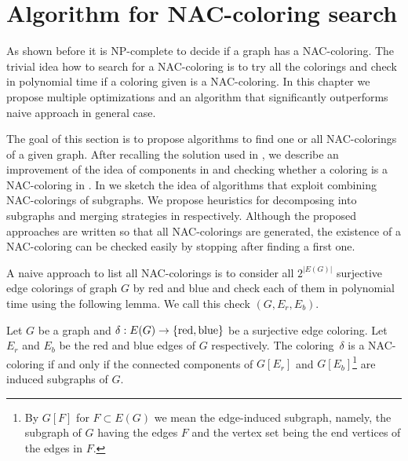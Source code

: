 \chapter{Algorithm for NAC-coloring search}%
\label{chapter:alg}

\begin{chapterabstract}

	As shown before it is NP-complete to decide if a graph has a NAC-coloring.
	The trivial idea how to search for a NAC-coloring is to try all the colorings
	and check in polynomial time if a coloring given is a NAC-coloring.
	In this chapter we propose multiple optimizations
	and an algorithm that significantly outperforms naive approach in general case.

\end{chapterabstract}


The goal of this section is to propose algorithms to find one or all NAC-colorings of a given graph.
After recalling the solution used in \flexrilog{},
we describe an improvement of the idea of \trcon{} components in 
and checking whether a coloring is a NAC-coloring in .
In  we sketch the idea of algorithms that
exploit combining NAC-colorings of subgraphs.
We propose heuristics for decomposing into subgraphs and merging strategies
in  respectively.
Although the proposed approaches are written so that all NAC-colorings are generated,
the existence of a NAC-coloring can be checked easily by stopping after finding a first one.

A naive approach to list all NAC-colorings is to consider
all $2^{|E(G)|}$ surjective edge colorings of graph $G$ by red and blue
and check each of them in polynomial time using the following lemma.
We call this check \IsNACColoring{}$(G, E_r, E_b)$.

\begin{lemma}
	\label{lemma:is_NAC_coloring}
	Let $G$ be a graph and $\delta: E(G) \to \{\text{red}, \text{blue}\}$ be a surjective edge coloring.
	Let $E_r$ and $E_b$ be the red and blue edges of $G$ respectively.
	The coloring~$\delta $ is a NAC-coloring if and only if
	the connected components of $G[E_r]$ and $G[E_b]$\footnote{
		By $G[F]$ for $F\subset E(G)$ we mean the edge-induced subgraph,
		namely, the subgraph of $G$ having the edges $F$ and the vertex set
		being the end vertices of the edges in $F$.}
	are induced subgraphs of $G$.
\end{lemma}

